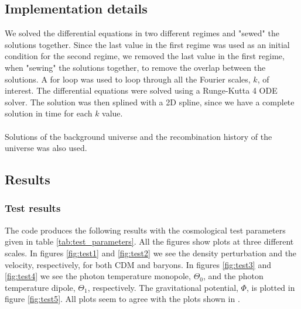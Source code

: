 \documentclass{aa}
\begin{document}
 


\subsection{Implementation details}
We solved the differential equations in two different regimes and "sewed" the solutions together.
Since the last value in the first regime was used as an initial condition for the second regime, we removed the last value 
in the first regime, when "sewing" the solutions together, to remove the overlap between the solutions. A for loop was used to loop through all the Fourier scales, $k$, of interest.
The differential equations were solved using a Runge-Kutta 4 ODE solver. The solution was then splined with a 2D spline, since we have a complete solution in time for each $k$ value.\\ \\
Solutions of the background universe and the recombination history of the universe was also used.

\subsection{Results}
\subsubsection{Test results}
The code produces the following results with the cosmological test parameters given in table \ref{tab:test_parameters}. All the figures show plots at three different scales.
In figures \ref{fig:test1} and \ref{fig:test2} we see the density perturbation and the velocity, respectively, for both CDM and baryons. In figures \ref{fig:test3}
and \ref{fig:test4} we see the photon temperature monopole, $\Theta_0$, and the photon temperature dipole, $\Theta_1$, respectively. The gravitational potential, $\Phi$, is plotted
in figure \ref{fig:test5}. All plots seem to agree with the plots shown in \cite{winther:2023}.   
\end{document}
